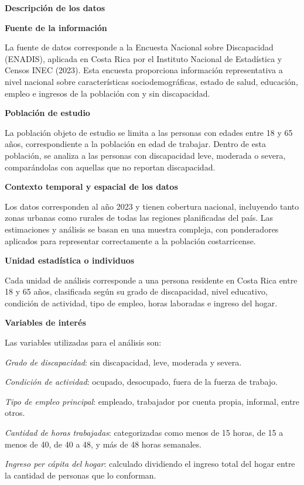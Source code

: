 \documentclass[
  11pt,
  oneside]{article}
\begin{document}
\textbf{Descripción de los datos}

\textbf{Fuente de la información}

La fuente de datos corresponde a la Encuesta Nacional sobre Discapacidad
(ENADIS), aplicada en Costa Rica por el Instituto Nacional de
Estadística y Censos INEC (2023). Esta encuesta proporciona información
representativa a nivel nacional sobre características sociodemográficas,
estado de salud, educación, empleo e ingresos de la población con y sin
discapacidad.

\textbf{Población de estudio}

La población objeto de estudio se limita a las personas con edades entre
18 y 65 años, correspondiente a la población en edad de trabajar. Dentro
de esta población, se analiza a las personas con discapacidad leve,
moderada o severa, comparándolas con aquellas que no reportan
discapacidad.

\textbf{Contexto temporal y espacial de los datos}

Los datos corresponden al año 2023 y tienen cobertura nacional,
incluyendo tanto zonas urbanas como rurales de todas las regiones
planificadas del país. Las estimaciones y análisis se basan en una
muestra compleja, con ponderadores aplicados para representar
correctamente a la población costarricense.

\textbf{Unidad estadística o individuos}

Cada unidad de análisis corresponde a una persona residente en Costa
Rica entre 18 y 65 años, clasificada según su grado de discapacidad,
nivel educativo, condición de actividad, tipo de empleo, horas laboradas
e ingreso del hogar.

\textbf{Variables de interés}

Las variables utilizadas para el análisis son:

\emph{Grado de discapacidad}: sin discapacidad, leve, moderada y severa.

\emph{Condición de actividad}: ocupado, desocupado, fuera de la fuerza
de trabajo.

\emph{Tipo de empleo principal}: empleado, trabajador por cuenta propia,
informal, entre otros.

\emph{Cantidad de horas trabajadas}: categorizadas como menos de 15
horas, de 15 a menos de 40, de 40 a 48, y más de 48 horas semanales.

\emph{Ingreso per cápita del hogar}: calculado dividiendo el ingreso
total del hogar entre la cantidad de personas que lo conforman.
\end{document}
